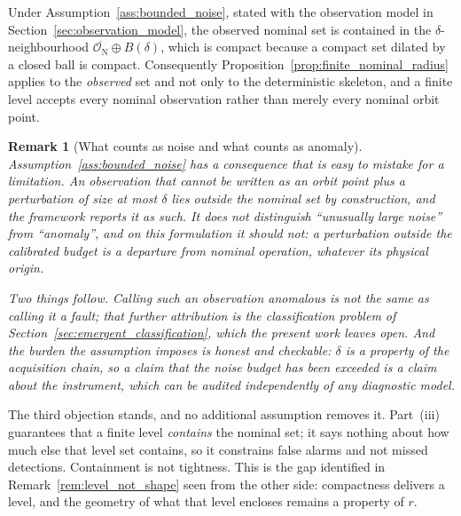 \documentclass[a4paper]{cas-sc}
\newtheorem{remark}{Remark}
\newcommand{\residual}{\ensuremath{r}}
\begin{document}
Under Assumption~\ref{ass:bounded_noise}, stated with the observation model in
Section~\ref{sec:observation_model}, the observed nominal set is contained in
the \(\delta\)-neighbourhood
\(\overline{\mathcal{O}_{\mathrm N}}\oplus B(\delta)\), which is compact
because a compact set dilated by a closed ball is compact. Consequently
Proposition~\ref{prop:finite_nominal_radius} applies to the \emph{observed}
set and not only to the deterministic skeleton, and a finite level accepts
every nominal observation rather than merely every nominal orbit point.

\begin{remark}[What counts as noise and what counts as anomaly]
\label{rem:noise_is_anomaly}
Assumption~\ref{ass:bounded_noise} has a consequence that is easy to mistake
for a limitation. An observation that cannot be written as an orbit point plus
a perturbation of size at most \(\delta\) lies outside the nominal set by
construction, and the framework reports it as such. It does not distinguish
``unusually large noise'' from ``anomaly'', and on this formulation it should
not: a perturbation outside the calibrated budget is a departure from nominal
operation, whatever its physical origin.

Two things follow. Calling such an observation anomalous is not the same as
calling it a fault; that further attribution is the classification problem of
Section~\ref{sec:emergent_classification}, which the present work leaves open.
And the burden the assumption imposes is honest and checkable: \(\delta\) is a
property of the acquisition chain, so a claim that the noise budget has been
exceeded is a claim about the instrument, which can be audited independently
of any diagnostic model.
\end{remark}

The third objection stands, and no additional assumption removes it.
Part~(iii) guarantees that a finite level \emph{contains} the nominal set; it
says nothing about how much else that level set contains, so it constrains
false alarms and not missed detections. Containment is not tightness. This is
the gap identified in Remark~\ref{rem:level_not_shape} seen from the other
side: compactness delivers a level, and the geometry of what that level
encloses remains a property of \(\residual\).
\end{document}
